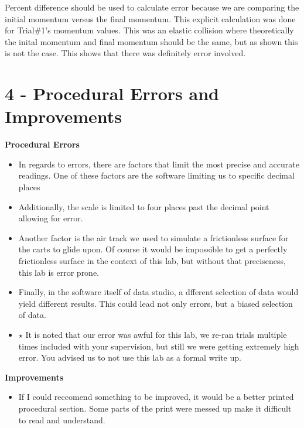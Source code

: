 \noindent Percent difference should be used to calculate error because we are comparing the 
initial momentum versus the final momentum. This explicit calculation was done for Trial\#1's
momentum values. This was an elastic collision where theoretically the inital momentum and
final momentum should be the same, but as shown this is not the case. This shows that there was
definitely error involved.

\newpage

\section*{4 - Procedural Errors and Improvements}

\noindent \textbf{Procedural Errors}
\begin{itemize}
  \item In regards to errors, there are factors that limit the most precise and 
        accurate readings. One of these factors are the software limiting us to 
        specific decimal places
  \item Additionally, the scale is limited to four places past the decimal point
        allowing for error.
  \item Another factor is the air track we used to simulate a frictionless surface
        for the carts to glide upon. Of course it would be impossible to get a 
        perfectly frictionless surface in the context of this lab, but without that
        preciseness, this lab is error prone.
  \item Finally, in the software itself of data studio, a dfferent selection of 
        data would yield different results. This could lead not only errors, but
        a biased selection of data.
  \item$\star$ It is noted that our error was awful for this lab, we re-ran trials 
               multiple times included with your supervision, but still we were 
               getting extremely high error. You advised us to not use this lab
               as a formal write up.
\end{itemize}

\noindent \textbf{Improvements}
\begin{itemize}
  \item If I could reccomend something to be improved, it would be a better printed
        procedural section. Some parts of the print were messed up make it difficult
        to read and understand.
\end{itemize}

